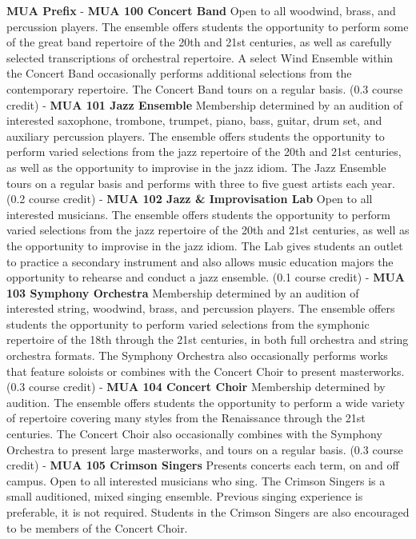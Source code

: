 \documentclass[
  letterpaper,
]{scrbook}
\begin{document}
\textbf{MUA Prefix} - \textbf{MUA 100 Concert Band} Open to all
woodwind, brass, and percussion players. The ensemble offers students
the opportunity to perform some of the great band repertoire of the 20th
and 21st centuries, as well as carefully selected transcriptions of
orchestral repertoire. A select Wind Ensemble within the Concert Band
occasionally performs additional selections from the contemporary
repertoire. The Concert Band tours on a regular basis. (0.3 course
credit) - \textbf{MUA 101 Jazz Ensemble} Membership determined by an
audition of interested saxophone, trombone, trumpet, piano, bass,
guitar, drum set, and auxiliary percussion players. The ensemble offers
students the opportunity to perform varied selections from the jazz
repertoire of the 20th and 21st centuries, as well as the opportunity to
improvise in the jazz idiom. The Jazz Ensemble tours on a regular basis
and performs with three to five guest artists each year. (0.2 course
credit) - \textbf{MUA 102 Jazz \& Improvisation Lab} Open to all
interested musicians. The ensemble offers students the opportunity to
perform varied selections from the jazz repertoire of the 20th and 21st
centuries, as well as the opportunity to improvise in the jazz idiom.
The Lab gives students an outlet to practice a secondary instrument and
also allows music education majors the opportunity to rehearse and
conduct a jazz ensemble. (0.1 course credit) - \textbf{MUA 103 Symphony
Orchestra} Membership determined by an audition of interested string,
woodwind, brass, and percussion players. The ensemble offers students
the opportunity to perform varied selections from the symphonic
repertoire of the 18th through the 21st centuries, in both full
orchestra and string orchestra formats. The Symphony Orchestra also
occasionally performs works that feature soloists or combines with the
Concert Choir to present masterworks. (0.3 course credit) - \textbf{MUA
104 Concert Choir} Membership determined by audition. The ensemble
offers students the opportunity to perform a wide variety of repertoire
covering many styles from the Renaissance through the 21st centuries.
The Concert Choir also occasionally combines with the Symphony Orchestra
to present large masterworks, and tours on a regular basis. (0.3 course
credit) - \textbf{MUA 105 Crimson Singers} Presents concerts each term,
on and off campus. Open to all interested musicians who sing. The
Crimson Singers is a small auditioned, mixed singing ensemble. Previous
singing experience is preferable, it is not required. Students in the
Crimson Singers are also encouraged to be members of the Concert Choir.
\end{document}
